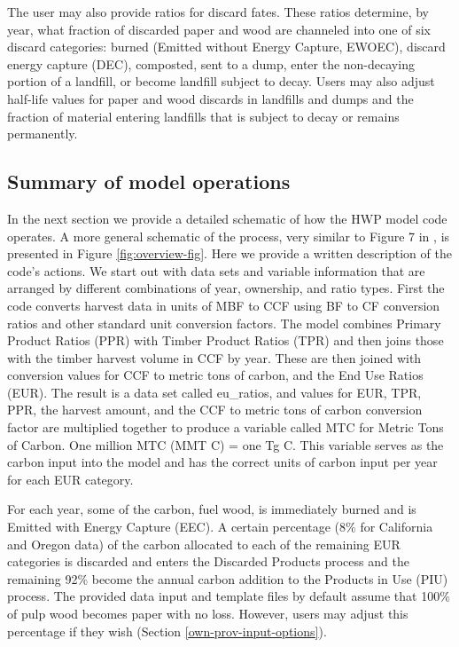 \documentclass[
  openany]{book}
\begin{document}
The user may also provide ratios for discard fates. These ratios determine, by year, what fraction of discarded paper and wood are channeled into one of six discard categories: burned (Emitted without Energy Capture, EWOEC), discard energy capture (DEC), composted, sent to a dump, enter the non-decaying portion of a landfill, or become landfill subject to decay. Users may also adjust half-life values for paper and wood discards in landfills and dumps and the fraction of material entering landfills that is subject to decay or remains permanently.

\hypertarget{model-func-opp}{%
\subsection{Summary of model operations}\label{model-func-opp}}

In the next section we provide a detailed schematic of how the HWP model code operates. A more general schematic of the process, very similar to Figure 7 in \textcite{stockmann2012}, is presented in Figure \ref{fig:overview-fig}. Here we provide a written description of the code's actions. We start out with data sets and variable information that are arranged by different combinations of year, ownership, and ratio types. First the code converts harvest data in units of MBF to CCF using BF to CF conversion ratios and other standard unit conversion factors. The model combines Primary Product Ratios (PPR) with Timber Product Ratios (TPR) and then joins those with the timber harvest volume in CCF by year. These are then joined with conversion values for CCF to metric tons of carbon, and the End Use Ratios (EUR). The result is a data set called eu\_ratios, and values for EUR, TPR, PPR, the harvest amount, and the CCF to metric tons of carbon conversion factor are multiplied together to produce a variable called MTC for Metric Tons of Carbon. One million MTC (MMT C) = one Tg C. This variable serves as the carbon input into the model and has the correct units of carbon input per year for each EUR category.

For each year, some of the carbon, fuel wood, is immediately burned and is Emitted with Energy Capture (EEC). A certain percentage (8\% for California and Oregon data) of the carbon allocated to each of the remaining EUR categories is discarded and enters the Discarded Products process and the remaining 92\% become the annual carbon addition to the Products in Use (PIU) process. The provided data input and template files by default assume that 100\% of pulp wood becomes paper with no loss. However, users may adjust this percentage if they wish (Section \ref{own-prov-input-options}).
\end{document}
